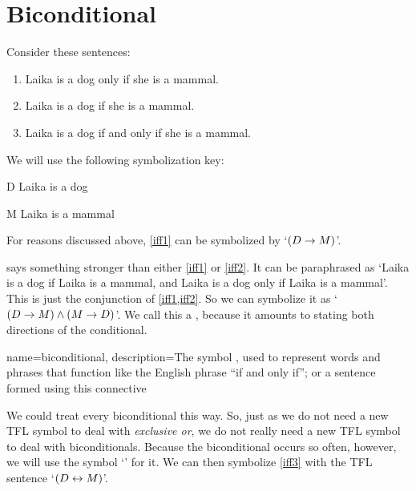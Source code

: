 \section{Biconditional}
Consider these sentences:
	\begin{enumerate}
		\item\label{iff1} Laika is a dog only if she is a mammal.
		\item\label{iff2} Laika is a dog if she is a mammal.
		\item\label{iff3} Laika is a dog if and only if she is a mammal.
	\end{enumerate}
We will use the following symbolization key:
	\begin{ekey}
		\item[D] Laika is a dog
		\item[M] Laika is a mammal
	\end{ekey}
For reasons discussed above, \cref*{iff1} can be symbolized by `$(D \rightarrow M)$'.


 says something stronger than either \cref*{iff1} or \cref*{iff2}. It can be paraphrased as `Laika is a dog if Laika is a mammal, and Laika is a dog only if Laika is a mammal'. This is just the conjunction of \cref*{iff1,iff2}. So we can symbolize it as `$(D \rightarrow M) \wedge (M \rightarrow D)$'. We call this a , because it amounts to stating both directions of the conditional.

{
name=biconditional,
description={The symbol \eiff, used to represent words and phrases that function like the English phrase ``if and only if''; or a sentence formed using this connective}
}

We could treat every biconditional this way. So, just as we do not need a new TFL symbol to deal with \emph{exclusive or}, we do not really need a new TFL symbol to deal with biconditionals. Because the biconditional occurs so often, however, we will use the symbol `\eiff' for it. We can then symbolize \cref*{iff3} with the TFL sentence `$(D \leftrightarrow M)$'.

